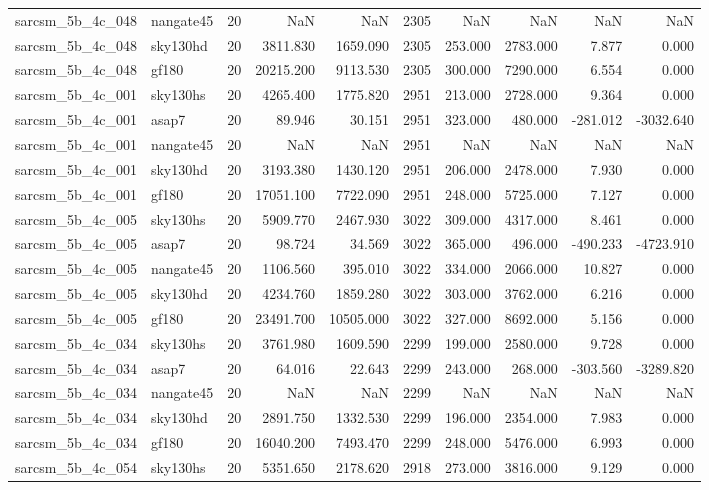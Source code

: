 \documentclass{article}
\begin{document}
\begin{longtable}{llrrrrrrrr}
sarcsm\_5b\_4c\_048 & nangate45 & 20 & NaN & NaN & 2305 & NaN & NaN & NaN & NaN \\
sarcsm\_5b\_4c\_048 & sky130hd & 20 & 3811.830 & 1659.090 & 2305 & 253.000 & 2783.000 & 7.877 & 0.000 \\
sarcsm\_5b\_4c\_048 & gf180 & 20 & 20215.200 & 9113.530 & 2305 & 300.000 & 7290.000 & 6.554 & 0.000 \\
sarcsm\_5b\_4c\_001 & sky130hs & 20 & 4265.400 & 1775.820 & 2951 & 213.000 & 2728.000 & 9.364 & 0.000 \\
sarcsm\_5b\_4c\_001 & asap7 & 20 & 89.946 & 30.151 & 2951 & 323.000 & 480.000 & -281.012 & -3032.640 \\
sarcsm\_5b\_4c\_001 & nangate45 & 20 & NaN & NaN & 2951 & NaN & NaN & NaN & NaN \\
sarcsm\_5b\_4c\_001 & sky130hd & 20 & 3193.380 & 1430.120 & 2951 & 206.000 & 2478.000 & 7.930 & 0.000 \\
sarcsm\_5b\_4c\_001 & gf180 & 20 & 17051.100 & 7722.090 & 2951 & 248.000 & 5725.000 & 7.127 & 0.000 \\
sarcsm\_5b\_4c\_005 & sky130hs & 20 & 5909.770 & 2467.930 & 3022 & 309.000 & 4317.000 & 8.461 & 0.000 \\
sarcsm\_5b\_4c\_005 & asap7 & 20 & 98.724 & 34.569 & 3022 & 365.000 & 496.000 & -490.233 & -4723.910 \\
sarcsm\_5b\_4c\_005 & nangate45 & 20 & 1106.560 & 395.010 & 3022 & 334.000 & 2066.000 & 10.827 & 0.000 \\
sarcsm\_5b\_4c\_005 & sky130hd & 20 & 4234.760 & 1859.280 & 3022 & 303.000 & 3762.000 & 6.216 & 0.000 \\
sarcsm\_5b\_4c\_005 & gf180 & 20 & 23491.700 & 10505.000 & 3022 & 327.000 & 8692.000 & 5.156 & 0.000 \\
sarcsm\_5b\_4c\_034 & sky130hs & 20 & 3761.980 & 1609.590 & 2299 & 199.000 & 2580.000 & 9.728 & 0.000 \\
sarcsm\_5b\_4c\_034 & asap7 & 20 & 64.016 & 22.643 & 2299 & 243.000 & 268.000 & -303.560 & -3289.820 \\
sarcsm\_5b\_4c\_034 & nangate45 & 20 & NaN & NaN & 2299 & NaN & NaN & NaN & NaN \\
sarcsm\_5b\_4c\_034 & sky130hd & 20 & 2891.750 & 1332.530 & 2299 & 196.000 & 2354.000 & 7.983 & 0.000 \\
sarcsm\_5b\_4c\_034 & gf180 & 20 & 16040.200 & 7493.470 & 2299 & 248.000 & 5476.000 & 6.993 & 0.000 \\
sarcsm\_5b\_4c\_054 & sky130hs & 20 & 5351.650 & 2178.620 & 2918 & 273.000 & 3816.000 & 9.129 & 0.000 \\

\end{longtable}
\end{document}
